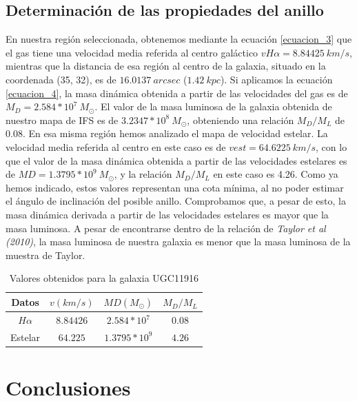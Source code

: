 \documentclass{article}
\begin{document}
\subsection{Determinación de las propiedades del anillo}
En nuestra región seleccionada, obtenemos mediante la ecuación \ref{ecuacion_3} que el gas tiene una velocidad media referida al centro galáctico $vH\alpha = 8.84425\ km/s$, mientras que la distancia de esa región al centro de la galaxia, situado en la coordenada (35, 32), es de $16.0137\ arcsec$ ($1.42\ kpc$). Si aplicamos la ecuación \ref{ecuacion_4}, la masa dinámica obtenida a partir de las velocidades del gas es de $M_{D} = 2.584*10^{7}\ M_{\odot}$. El valor de la masa luminosa de la galaxia obtenida de nuestro mapa de IFS es de $3.2347*10^{8}\ M_{\odot}$, obteniendo una relación $M_{D} / M_{L}$ de 0.08.
En esa misma región hemos analizado el mapa de velocidad estelar. La velocidad media referida al centro en este caso es de $vest = 64.6225\ km/s$, con lo que el valor de la masa dinámica obtenida a partir de las velocidades estelares es de $MD = 1.3795*10^{9}\ M_{\odot}$, y la relación $M_{D} / M_{L}$ en este caso es 4.26. 
Como ya hemos indicado, estos valores representan una cota mínima, al no poder estimar el ángulo de inclinación del posible anillo. Comprobamos que, a pesar de esto, la masa dinámica derivada a partir de las velocidades estelares es mayor que la masa luminosa. A pesar de encontrarse dentro de la relación de \emph{Taylor et al (2010)}, la masa luminosa de nuestra galaxia es menor que la masa luminosa de la muestra de Taylor.\\

\begin{table}[H]
\centering
\begin{tabular}{cccc} \toprule
Datos & $v(km/s)$ & $MD(M_{\odot})$ & $M_{D} / M_{L}$\\ \midrule
$H\alpha$ & $8.84426$ & $2.584*10^{7}$ & $0.08$\\
Estelar & $64.225$ & $1.3795*10^{9}$ & $4.26$\\ \bottomrule
\end{tabular}
\caption{Valores obtenidos para la galaxia UGC11916}
\label{Tabla_1}
\end{table}

\section{Conclusiones}
\end{document}
